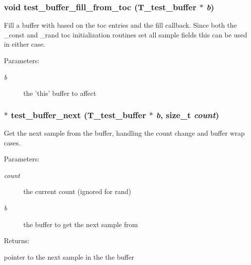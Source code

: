 \subsubsection{\setlength{\rightskip}{0pt plus 5cm}void test\_\-buffer\_\-fill\_\-from\_\-toc ({\bf T\_\-test\_\-buffer} $\ast$ {\em b})}\label{test__utils_8h_a45}


Fill a buffer with based on the toc entries and the fill callback. Since both the \_\-const and \_\-rand toc initialization routines set all sample fields this can be used in either case.

\begin{Desc}
\item[Parameters: ]\par
\begin{description}
\item[{\em 
b}]the 'this' buffer to affect \end{description}
\end{Desc}
\subsubsection{$\ast$ test\_\-buffer\_\-next ({\bf T\_\-test\_\-buffer} $\ast$ {\em b}, size\_\-t {\em count})}\label{test__utils_8h_a51}


Get the next sample from the buffer, handling the count change and buffer wrap cases.

\begin{Desc}
\item[Parameters: ]\par
\begin{description}
\item[{\em 
count}]the current count (ignored for rand) \item[{\em 
b}]the buffer to get the next sample from \end{description}
\end{Desc}
\begin{Desc}
\item[Returns: ]\par
pointer to the next sample in the the buffer \end{Desc}
